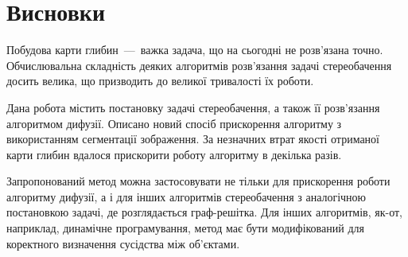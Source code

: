 \chapter*{Висновки}

Побудова карти глибин~---~важка задача, що
на сьогодні не розв'язана точно.
Обчислювальна складність деяких алгоритмів розв'язання задачі стереобачення
досить велика, що призводить до великої тривалості їх роботи.

Дана робота містить постановку задачі стереобачення,
а також її розв'язання алгоритмом дифузії.
Описано новий спосіб прискорення алгоритму
з використанням сегментації зображення.
За незначних втрат якості отриманої карти глибин вдалося прискорити
роботу алгоритму в декілька разів.

Запропонований метод можна застосовувати
не тільки для прискорення роботи алгоритму дифузії,
а і для інших алгоритмів стереобачення з аналогічною постановкою задачі,
де розглядається граф-решітка.
Для інших алгоритмів, як-от, наприклад, динамічне програмування,
метод має бути модифікований для коректного визначення сусідства між об'єктами.
